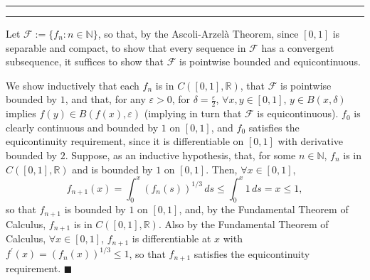 \documentclass[11pt]{article}
\newcounter{questionCounter}
\newcounter{partCounter}[questionCounter]
\newenvironment{question}[2][\arabic{questionCounter}]{%
    \setcounter{partCounter}{0}%
    \vspace{.25in} \hrule \vspace{0.5em}%
        \noindent{\bf #2}%
    \vspace{0.8em} \hrule \vspace{.10in}%
    \addtocounter{questionCounter}{1}%
}{}
\renewcommand{\qed}{\quad $\blacksquare$}
\newcommand{\N}{\mathbb{N}} %
\newcommand{\R}{\mathbb{R}} %
\newcommand{\e}{\varepsilon} %
\begin{document}
\begin{question}{Problem 7}
Let $\mathcal{F} := \{f_n : n \in \N\}$, so that, by the Ascoli-Arzel\`{a}
Theorem, since $[0,1]$ is separable and compact, to show that every sequence in
$\mathcal{F}$ has a convergent subsequence, it suffices to show that
$\mathcal{F}$ is pointwise bounded and equicontinuous.

We show inductively that each $f_n$ is in $C([0,1],\R)$, that $\mathcal{F}$ is
pointwise bounded by $1$, and that, for any $\e > 0$, for $\delta =
\frac{\e}{2}$, $\forall x,y \in [0,1]$, $y \in B(x,\delta)$ implies $f(y) \in
B(f(x),\e)$ (implying in turn that $\mathcal{F}$ is equicontinuous). $f_0$
is clearly continuous and bounded by $1$ on $[0,1]$, and $f_0$ satisfies the
equicontinuity requirement, since it is differentiable on $[0,1]$ with
derivative bounded by $2$. Suppose, as an inductive hypothesis, that, for some
$n \in \N$, $f_n$ is in $C([0,1],\R)$ and is bounded by $1$ on $[0,1]$. Then,
$\forall x \in [0,1]$,
\[
f_{n + 1}(x)
 = \int_0^x (f_n(s))^{1/3} \, ds
 \leq \int_0^x 1 \, ds
 = x
 \leq 1,
\]
so that $f_{n + 1}$ is bounded by $1$ on $[0,1]$, and, by the Fundamental
Theorem of Calculus, $f_{n + 1}$ is in $C([0,1],\R)$. Also by the Fundamental
Theorem of Calculus, $\forall x \in [0,1]$, $f_{n + 1}$ is differentiable at
$x$ with $f^{\prime}(x) = (f_n(x))^{1/3} \leq 1$, so that $f_{n + 1}$ satisfies
the equicontinuity requirement. \qed
\end{question}
\end{document}

